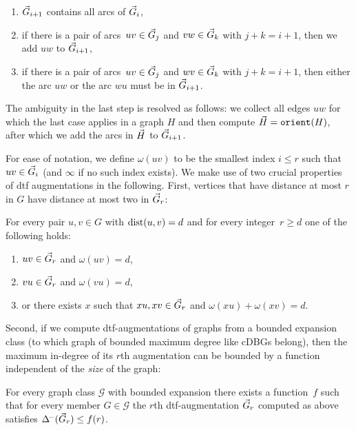 \begin{enumerate}
    \item $\vec{G}_{i+1}$ contains all arcs of $\vec{G}_i$,
    \item if there is a pair of arcs~$uv \in \vec{G}_j$ 
          and $vw \in \vec{G}_k$ with $j + k = i + 1$, then
          we add $uw$ to $\vec{G}_{i+1}$,
    \item if there is a pair of arcs~$uv \in \vec{G}_j$ 
          and $wv \in \vec{G}_k$ with $j + k = i + 1$, then
          either the arc $uw$ or the arc $wu$ must be
          in $\vec{G}_{i+1}$.
\end{enumerate}
The ambiguity in the last step is resolved as follows: 
we collect all edges $uw$ for which the last case applies
in a graph $H$ and then compute $\vec{H} = \texttt{orient}(H)$,
after which we add the arcs in $\vec{H}$ to $\vec{G}_{i+1}$.

For ease of notation, we define $\omega(uv)$ to be the
smallest index $i \leq r$ such that $uv \in \vec{G}_i$
(and $\infty$ if no such index exists).
We make use of two crucial properties of dtf augmentations 
in the following. First, vertices that have distance at most
$r$ in $G$ have distance at most two in $\vec{G}_r$:

\begin{lemma}
  For every pair $u,v \in G$ with $\text{dist}(u,v) = d$ and
  for every integer~$r \geq d$ one of the following holds:
  \begin{enumerate}
    \item $uv \in \vec{G}_r$ and $\omega(uv) = d$,
    \item $vu \in \vec{G}_r$ and $\omega(vu) = d$,
    \item or there exists $x$ such that $xu, xv \in \vec{G}_r$ and
          $\omega(xu) + \omega(xv) = d$.
  \end{enumerate}
\end{lemma}

\noindent
Second, if we compute dtf-augmentations of graphs from a bounded
expansion class (to which graph of bounded maximum degree like
cDBGs belong), then the maximum in-degree
of its $r$th augmentation can be bounded by a function independent
of the \emph{size} of the graph:

\begin{theorem}\label{thm:dtf}
  For every graph class $\mathcal G$ with bounded expansion there exists
  a function~$f$ such that for every member $G \in \mathcal G$
  the $r$th dtf-augmentation $\vec{G}_r$ computed as above
  satisfies
  $\Delta^{\!-}(\vec{G}_r) \leq f(r)$.
\end{theorem}

